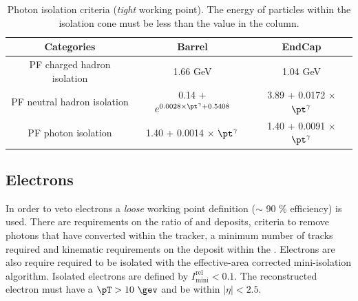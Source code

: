 \begin{table}[ht!]
  \caption{Photon isolation criteria (\emph{tight} working point). The
  energy of particles within the isolation cone must be less than the
  value in the column.\label{tab:photon-id-gamma}}
  \centering
  \footnotesize
  \begin{tabular}{ ccc }
    \hline
    \hline
    Categories                    & Barrel                             & EndCap                             \\
    \hline
    PF charged hadron isolation   & 1.66 GeV & 1.04 GeV                          \\
    PF neutral hadron isolation   & 0.14 + $ e^{0.0028 \times \pt^{\gamma} + 0.5408}$  &  3.89 + 0.0172 $\times$ $\pt^{\gamma}$\\
    PF photon isolation           & 1.40 + 0.0014 $\times$ $\pt^{\gamma}$ & 1.40 + 0.0091 $\times$ $\pt^{\gamma}$ \\
    \hline
    \hline
  \end{tabular}
  \end{table}

\subsection{Electrons}
\label{sec:electron-id}

In order to veto electrons a \emph{loose} working point definition
($\sim$ 90 $\%$ efficiency) is used. There are requirements on the
ratio of \HCAL and \ECAL deposits, criteria to remove photons that
have converted within the tracker, a minimum number of tracks required
and kinematic requirements on the deposit within the \ECAL. Electrons
are also require required to be isolated with the effective-area
corrected mini-isolation algorithm.  Isolated electrons are defined by
$I^{\textrm{rel}}_{\textrm{mini}} < 0.1$. The reconstructed electron
must have a $\pT>10~\gev$ and be within $|\eta|<2.5$.

